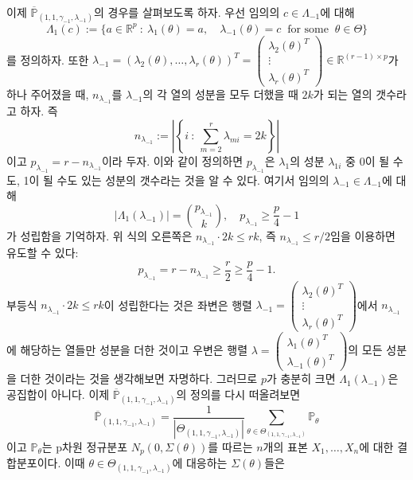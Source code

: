 이제 $\overline{\mathbb{P}}_{(1,1,\gamma_{-1}, \lambda_{-1})}$의 경우를 살펴보도록 하자. 우선 임의의 $c \in \Lambda_{-1}$에 대해
\[
\Lambda_1(c) := \{a \in \mathbb{R}^p \ : \ \lambda_1(\theta) = a, \quad \lambda_{-1}(\theta) =c \ \mbox{ for some } \ \theta \in \Theta \}
\]
를 정의하자. 또한 $\lambda_{-1} = (\lambda_2 (\theta), \dots, \lambda_r(\theta))^T = \left(\begin{array}{c}\lambda_2(\theta)^T\\ \hline \vdots \\ \hline \lambda_r(\theta)^T \end{array}\right) \in \mathbb{R}^{(r-1)\times p}$가 하나 주어졌을 때, $n_{\lambda_{-1}}$를 $\lambda_{-1}$의 각 열의 성분을 모두 더했을 때 $2k$가 되는 열의 갯수라고 하자. 즉
\[
n_{\lambda_{-1}} := \left| \left\{ i \ : \ \sum_{m=2}^r \lambda_{mi} = 2k\right\}\right|
\]
이고 $p_{\lambda_{-1}} = r -n_{\lambda_{-1}}$이라 두자. 이와 같이 정의하면 $p_{\lambda_{-1}}$은 $\lambda_1$의 성분 $\lambda_{1i}$ 중 0이 될 수도, 1이 될 수도 있는 성분의 갯수라는 것을 알 수 있다. 여기서 임의의 $\lambda_{-1}\in \Lambda_{-1}$에 대해 
\[
|\Lambda_1(\lambda_{-1}) | = \binom{p_{\lambda_{-1}}}{k}, \quad p_{\lambda_{-1}} \ge \frac p4 -1
\]
가 성립함을 기억하자. 위 식의 오른쪽은 $n_{\lambda_{-1}} \cdot 2k \le r k$, 즉 $n_{\lambda_{-1}} \le r/2$임을 이용하면 유도할 수 있다:
\[
p_{\lambda_{-1}} = r - n_{\lambda_{-1}} \ge \frac r2  \ge \frac p4 -1.
\]
부등식 $n_{\lambda_{-1}} \cdot 2k \le r k$이 성립한다는 것은 좌변은 행렬  $\lambda_{-1} =  \left(\begin{array}{c}\lambda_2(\theta)^T\\ \hline \vdots \\ \hline \lambda_r(\theta)^T \end{array}\right) $에서  $n_{\lambda_{-1}}$에 해당하는 열들만 성분을 더한 것이고 우변은 행렬 $\lambda =  \left(\begin{array}{c}\lambda_1(\theta)^T\\ \hline 
 \lambda_{-1}(\theta)^T \end{array}\right)$의 모든 성분을 더한 것이라는 것을 생각해보면 자명하다. 그러므로 $p$가 충분히 크면 $\Lambda_1(\lambda_{-1})$은 공집합이 아니다. 이제 $\overline{\mathbb{P}}_{(1,1,\gamma_{-1}, \lambda_{-1})}$의 정의를 다시 떠올려보면
\[
\overline{\mathbb{P}}_{(1,1,\gamma_{-1}, \lambda_{-1})} = \frac{1}{|\Theta_{(1,1,\gamma_{-1}, \lambda_{-1})}|} \sum_{\theta \in \Theta_{(1,1,\gamma_{-1}, \lambda_{-1})}} \mathbb{P}_\theta
\]
이고 $\mathbb{P}_\theta$는 p차원 정규분포 $N_p(0,\Sigma(\theta))$를 따르는 $n$개의 표본 $X_1, \dots, X_n$에 대한 결합분포이다. 이때 $\theta\in\Theta_{(1,1,\gamma_{-1}, \lambda_{-1})}$에 대응하는 $\Sigma(\theta)$들은 

